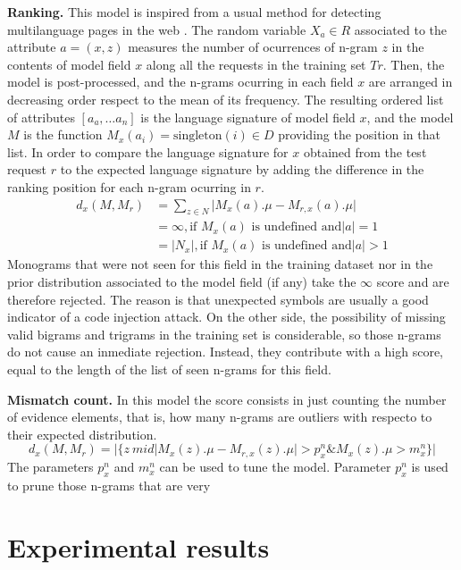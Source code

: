 \documentclass[runningheads,a4paper]{llncs}
\begin{document}
\textbf{Ranking.} This model is inspired from a usual method for detecting multilanguage pages in the web \cite{Cavnar94n-gram-basedtext}. The random variable $X_a \in R$ associated to the attribute $a=(x,z)$ measures the number of ocurrences of n-gram $z$ in the contents of model field $x$ along all the requests in the training set $Tr$. Then, the model is post-processed, and the n-grams ocurring in each field $x$ are arranged in decreasing order respect to the mean of its frequency.  The resulting ordered list of attributes $[a_a,\ldots a_n]$ is the language signature of model field $x$, and the model $M$ is the function $M_x(a_i)=\text{singleton}(i) \in D$ providing the position in that list. In order to compare the language signature for $x$ obtained from the test request $r$ to the expected language signature by adding the difference in the ranking position for each n-gram ocurring in $r$. 
\begin{align*}
\label{RankDistance}
d_x(M,M_r) & = \sum_{z\in N} \lvert M_x(a).\mu - M_{r,x}(a).\mu\rvert \\
          & = \infty, \text{if } M_x(a) \text{ is undefined and} \lvert a\rvert = 1 \\
          & = \lvert  N_x \rvert, \text{if } M_x(a) \text{ is undefined and} \lvert a\rvert > 1
\end{align*}
Monograms that were not seen for this field in the training dataset nor in the prior distribution associated to the model field (if any) take the $\infty$ score and are therefore rejected. The reason is that unexpected symbols are usually a good indicator of a code injection attack. On the other side, the possibility of missing valid bigrams and trigrams in the training set is considerable, so those n-grams do not cause an inmediate rejection. Instead, they contribute with a high score, equal to the length of the list of seen n-grams for this field. 

\textbf{Mismatch count.} In this model the score consists in just counting the number of evidence elements, that is, how many n-grams are outliers with respecto to their expected distribution. 
\begin{equation}
\label{MismatchCountDistance}
d_x(M,M_r) = \lvert \{ z \ mid \lvert M_x(z).\mu - M_{r,x}(z).\mu\rvert > p^n_x \& M_x(z).\mu > m^n_x\} \rvert 
\end{equation}
The parameters $p^n_x$ and $m^n_x$ can be used to tune the model. Parameter $p^n_x$ is used to prune those n-grams that are very 

\section{Experimental results}
\end{document}
